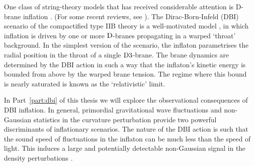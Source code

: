 One class of string-theory models that has received 
considerable attention is D-brane inflation
\cite{brane1,brane2,brane3,brane4,brane5,
brane6,brane7,brane8,brane9,brane10,brane11,brane12,brane13,
brane14,brane15,brane16,brane17,Brodie:2003qv,Vikman:2006hk, 
Mukhanov:2005bu,Kallosh:2007wm,brane18,
brane19,brane20,brane21}. 
(For some recent reviews, see
\cite{tyereview,cline,McAllister:2007bg,Lorenz:2007ze,
Bean:2007eh,bean}). 
The Dirac-Born-Infeld (DBI) scenario 
of the compactified type IIB theory is a well-motivated model \cite{brane6,brane11}, 
in which inflation is driven by one or more ${\rm D}$-branes 
propagating in a warped `throat' background. 
% 
In the simplest version of the scenario, 
the inflaton parametrises the radial 
position in the throat of a single ${\rm D3}$-brane. 
The brane dynamics are determined by the DBI action in such a 
way that the inflaton's kinetic energy is bounded from above by the warped 
brane tension. The regime where this bound is nearly saturated is 
known as the `relativistic' limit.






In Part~\ref{part:dbi} of this thesis we will 
explore the observational consequences of DBI inflation. 
In general, primordial gravitational wave fluctuations
and non-Gaussian statistics in the curvature perturbation provide 
two powerful discriminants of inflationary scenarios. 
The nature of the DBI action is such that the sound 
speed of fluctuations in the inflaton can be much less than the speed of 
light. This induces a large and potentially detectable non-Gaussian 
signal in the density perturbations \cite{brane6,brane11,lidser3,chenetal}. 


